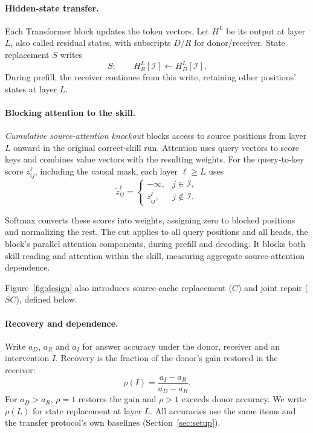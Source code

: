 \paragraph{Hidden-state transfer.}
Each Transformer block updates the token vectors. Let $H^L$ be its output
at layer $L$, also called residual states, with subscripts $D/R$ for
donor/receiver. State replacement $S$ writes
\begin{equation}
S:\qquad H_R^L[\mathcal I]\leftarrow H_D^L[\mathcal I].
\label{eq:inject}
\end{equation}
During prefill, the receiver continues from this write, retaining other
positions' states at layer $L$.

\begin{samepage}
\paragraph{Blocking attention to the skill.}
\emph{Cumulative source-attention knockout} blocks access to source
positions from layer $L$ onward in the original correct-skill run.
Attention uses query vectors to score keys and combines value vectors
with the resulting weights. For the query-to-key score $z^\ell_{ij}$,
including the causal mask, each layer $\ell\ge L$ uses
\begin{equation}
\widetilde z^\ell_{ij}=
\begin{cases}
-\infty,&j\in\mathcal I,\\
z^\ell_{ij},&j\notin\mathcal I.
\end{cases}
\label{eq:knockout}
\end{equation}
\end{samepage}
Softmax converts these scores into weights, assigning zero to blocked
positions and normalizing the rest. The cut applies to all query positions
and all heads, the block's parallel attention components, during prefill
and decoding. It blocks both skill reading and attention within the skill,
measuring aggregate source-attention dependence.

Figure~\ref{fig:design} also introduces source-cache replacement ($C$)
and joint repair ($SC$), defined below.



\paragraph{Recovery and dependence.}
Write $a_D$, $a_R$ and $a_I$ for answer accuracy under the donor, receiver
and an intervention $I$. Recovery is the fraction of the donor's gain
restored in the receiver:
\begin{equation}
\rho(I)=\frac{a_I-a_R}{a_D-a_R}.
\label{eq:rho}
\end{equation}
For $a_D>a_R$, $\rho=1$ restores the gain and $\rho>1$ exceeds donor
accuracy. We write $\rho(L)$ for state replacement at layer $L$.
All accuracies use the same items and the transfer protocol's own
baselines (Section~\ref{sec:setup}).

